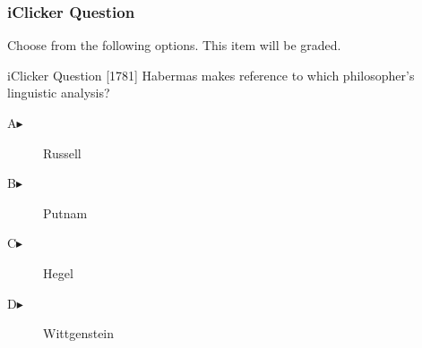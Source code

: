 \begin{frame}
  \frametitle{iClicker Question}
Choose from the following options. This item will be graded.
\begin{block}{iClicker Question}
[1781] Habermas makes reference to which philosopher's linguistic analysis?
\end{block}
\begin{description}
\item[A\hspace{.2in}$\blacktriangleright$] Russell
\item[B\hspace{.2in}$\blacktriangleright$] Putnam
\item[C\hspace{.2in}$\blacktriangleright$] Hegel
\item[D\hspace{.2in}$\blacktriangleright$] Wittgenstein
\end{description}
\end{frame}
